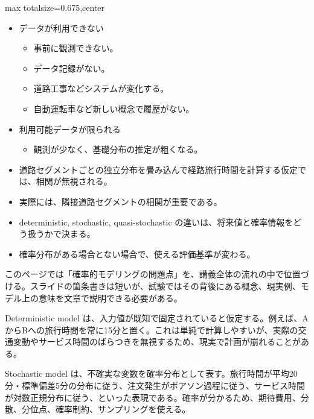 \clearpage
{}
\begin{adjustbox}{max totalsize={\textwidth}{0.675\textheight},center}
\begin{minipage}{\textwidth}\scriptsize
\begin{minipage}[t]{0.485\textwidth}
\begin{itemize}
\item データが利用できない
\begin{itemize}
\item 事前に観測できない。
\item データ記録がない。
\item 道路工事などシステムが変化する。
\item 自動運転車など新しい概念で履歴がない。
\end{itemize}
\item 利用可能データが限られる
\begin{itemize}
\item 観測が少なく、基礎分布の推定が粗くなる。
\end{itemize}
\item 道路セグメントごとの独立分布を畳み込んで経路旅行時間を計算する仮定では、相関が無視される。
\item 実際には、隣接道路セグメントの相関が重要である。
\end{itemize}
\begin{itemize}
\item deterministic, stochastic, quasi-stochastic の違いは、将来値と確率情報をどう扱うかで決まる。
\item 確率分布がある場合とない場合で、使える評価基準が変わる。
\end{itemize}
\end{minipage}\hfill
\begin{minipage}[t]{0.485\textwidth}
このページでは「確率的モデリングの問題点」を、講義全体の流れの中で位置づける。スライドの箇条書きは短いが、試験ではその背後にある概念、現実例、モデル上の意味を文章で説明できる必要がある。\par
Deterministic model は、入力値が既知で固定されていると仮定する。例えば、AからBへの旅行時間を常に15分と置く。これは単純で計算しやすいが、実際の交通変動やサービス時間のばらつきを無視するため、現実で計画が崩れることがある。\par
Stochastic model は、不確実な変数を確率分布として表す。旅行時間が平均20分・標準偏差5分の分布に従う、注文発生がポアソン過程に従う、サービス時間が対数正規分布に従う、といった表現である。確率が分かるため、期待費用、分散、分位点、確率制約、サンプリングを使える。\par

\end{minipage}
\end{minipage}
\end{adjustbox}
